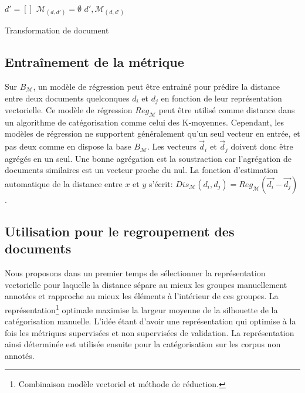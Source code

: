 \begin{algorithm}[!htb] %
	\footnotesize
 ${d'} = [] $\; 
 $\mathcal{M}_{(d,d')} = \emptyset$\;
 \Return $d', \mathcal{M}_{(d,d')}$\;
 \caption{Transformation de document} \label{algo:similarite:modifierdoc}
\end{algorithm}



\subsection{Entraînement de la métrique}

Sur $B_\mathcal{M}$, un modèle de régression peut être entrainé pour prédire la distance entre deux documents quelconques $d_i$ et $d_j$ en fonction de leur représentation vectorielle. Ce modèle de régression $Reg_\mathcal{M}$ peut être utilisé comme distance dans un algorithme de catégorisation comme celui des K-moyennes. Cependant, les modèles de régression ne supportent généralement qu'un seul vecteur en entrée, et pas deux comme en dispose la base $B_\mathcal{M}$. Les vecteurs $\vec{d}_i$ et $\vec{d}_j$ doivent donc être agrégés en un seul. Une bonne agrégation est la soustraction car l'agrégation de documents similaires est un vecteur proche du nul. La fonction d'estimation automatique de la distance entre $x$ et $y$ s'écrit: $Dis_\mathcal{M}(d_i, d_j) = Reg_\mathcal{M}(\vec{d_{i}} - \vec{d_{j}})$. 

\subsection{Utilisation pour le regroupement des documents}
 Nous proposons dans un premier temps de sélectionner la représentation vectorielle pour laquelle la distance sépare au mieux les groupes manuellement annotées et rapproche au mieux les éléments à l'intérieur de ces groupes. La représentation\footnote{Combinaison modèle vectoriel et méthode de réduction.} optimale maximise la largeur moyenne de la silhouette de la catégorisation manuelle. L'idée étant d'avoir une représentation qui optimise à la fois les métriques supervisées et non supervisées de validation. La représentation ainsi déterminée est utilisée ensuite pour la catégorisation sur les corpus non annotés. %

